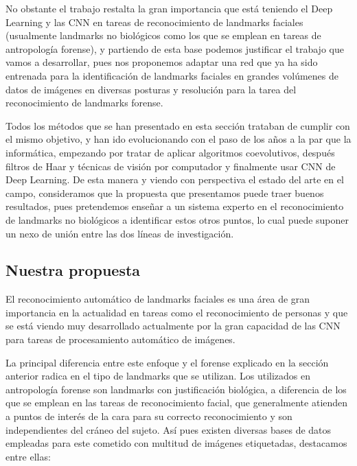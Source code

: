                 \medskip

                \noindent No obstante el trabajo restalta la gran importancia que está teniendo el Deep Learning y las CNN en tareas de reconocimiento de landmarks faciales (usualmente landmarks no biológicos como los que se emplean en tareas de antropología forense), y partiendo de esta base podemos justificar el trabajo que vamos a desarrollar, pues nos proponemos adaptar una red que ya ha sido entrenada para la identificación de landmarks faciales en grandes volúmenes de datos de imágenes en diversas posturas y resolución para la tarea del reconocimiento de landmarks forense.

                \medskip

                \noindent Todos los métodos que se han presentado en esta sección trataban de cumplir con el mismo objetivo, y han ido evolucionando con el paso de los años a la par que la informática, empezando por tratar de aplicar algoritmos coevolutivos, después filtros de Haar y técnicas de visión por computador y finalmente usar CNN de Deep Learning. De esta manera y viendo con perspectiva el estado del arte en el campo, consideramos que la propuesta que presentamos puede traer buenos resultados, pues pretendemos enseñar a un sistema experto en el reconocimiento de landmarks no biológicos a identificar estos otros puntos, lo cual puede suponer un nexo de unión entre las dos líneas de investigación.

        \subsection{Nuestra propuesta}
            \noindent El reconocimiento automático de landmarks faciales es una área de gran importancia en la actualidad en tareas como el reconocimiento de personas y que se está viendo muy desarrollado actualmente por la gran capacidad de las CNN para tareas de procesamiento automático de imágenes. 


            \medskip 

            \noindent La principal diferencia entre este enfoque y el forense explicado en la sección anterior radica en el tipo de landmarks que se utilizan. Los utilizados en antropología forense son landmarks con justificación biológica, a diferencia de los que se emplean en las tareas de reconocimiento facial, que generalmente atienden a puntos de interés de la cara para su correcto reconocimiento y son independientes del cráneo del sujeto. Así pues existen diversas bases de datos empleadas para este cometido con multitud de imágenes etiquetadas, destacamos entre ellas: 

